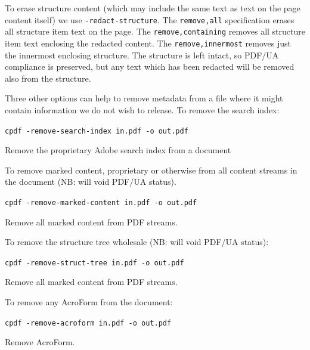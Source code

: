 \documentclass{book}
\begin{document}
To erase structure content (which may include the same text as text on the page content itself) we use \texttt{-redact-structure}. The \texttt{remove,all} specification erases all structure item text on the page. The \texttt{remove,containing} removes all structure item text enclosing the redacted content. The \texttt{remove,innermost} removes just the innermost enclosing structure. The structure is left intact, so PDF/UA compliance is preserved, but any text which has been redacted will be removed also from the structure.

Three other options can help to remove metadata from a file where it might contain information we do not wish to release. To remove the search index:

  \begin{framed}
    \noindent\small\verb!cpdf -remove-search-index in.pdf -o out.pdf!
 
    \vspace{2.5mm}
    \noindent Remove the proprietary Adobe search index from a document
  \end{framed}

\noindent To remove marked content, proprietary or otherwise from all content streams in the document (NB: will void PDF/UA status).

  \begin{framed}
    \noindent\small\verb!cpdf -remove-marked-content in.pdf -o out.pdf!
 
    \vspace{2.5mm}
    \noindent Remove all marked content from PDF streams.
  \end{framed}


\noindent To remove the structure tree wholesale (NB: will void PDF/UA status):


  \begin{framed}
    \noindent\small\verb!cpdf -remove-struct-tree in.pdf -o out.pdf!
 
    \vspace{2.5mm}
    \noindent Remove all marked content from PDF streams.
  \end{framed}




\noindent To remove any AcroForm from the document:

  \begin{framed}
    \noindent\small\verb!cpdf -remove-acroform in.pdf -o out.pdf!
 
    \vspace{2.5mm}
    \noindent Remove AcroForm.
  \end{framed}
\end{document}
